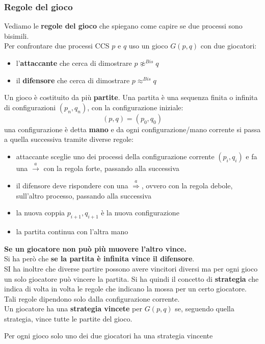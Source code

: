 \documentclass[a4paper,12pt, oneside]{book}
\begin{document}
\subsubsection{Regole del gioco}
Vediamo le \textbf{regole del gioco} che spiegano come capire se due processi
sono bisimili. \\
Per confrontare due processi CCS $p$ e $q$ uso un gioco $G(p,q)$ con due
giocatori: 
\begin{itemize}
  \item l'\textbf{attaccante} che cerca di dimostrare $p\not\approx^{Bis}q$
  \item il \textbf{difensore }che cerca di dimostrare $p\approx^{Bis}q$
\end{itemize}
Un gioco è costituito da più \textbf{partite}.
Una partita è una sequenza finita o infinita di configurazioni $(p_n,q_n)$, con
la configurazione iniziale:
\[(p,q)=(p_0,q_0)\]
una configurazione è detta \textbf{mano} e da ogni configurazione/mano corrente
si passa a quella successiva tramite diverse regole:
\begin{itemize}
  \item attaccante sceglie uno dei processi della configurazione corrente
  $(p_i,q_i)$ e fa una $\stackrel{a}{\rightarrow}$ con la regola forte, passando
  alla successiva
  \item il difensore deve rispondere con una $\stackrel{a}{\Rightarrow}$, ovvero
  con la regola debole, sull'altro processo, passando alla successiva
  \item la nuova coppia $p_{i+1},q_{i+1}$ è la nuova configurazione
  \item la partita continua con l'altra mano
\end{itemize}
\textbf{Se un giocatore non può più muovere l'altro vince.}\\
Si ha però che \textbf{se la partita è infinita vince il difensore}.\\
SI ha inoltre che diverse partire possono avere vincitori diversi ma per ogni
gioco un solo giocatore può vincere la partita. Si ha quindi il concetto di
\textbf{strategia} che indica di volta in volta le regole che indicano la mossa
per un certo giocatore. Tali regole dipendono solo dalla configurazione
corrente.\\
Un giocatore ha una \textbf{strategia vincete} per $G(p,q)$ se, seguendo quella
strategia, vince tutte le partite del gioco.
\begin{teorema}
  Per ogni gioco solo uno dei due giocatori ha una strategia vincente
\end{teorema}
\end{document}
